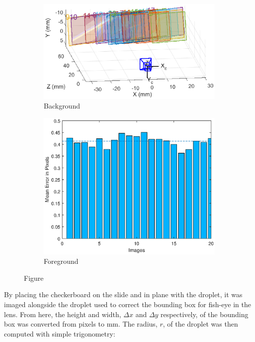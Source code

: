 \documentclass{physics_article_B}
\begin{document}
\begin{figure}[H]
    \centering
    \begin{subfigure}[b]{0.4\textwidth}
        \includegraphics[width=\textwidth]{Figures/CameraExtrinsics.eps}
        \caption{Background}
        \label{fig:calib:pos}
    \end{subfigure}
    \begin{subfigure}[b]{0.4\textwidth}
        \includegraphics[width=\textwidth]{Figures/CameraError.eps}
        \caption{Foreground}
        \label{fig:calib:error}
    \end{subfigure}
    \caption{Figure }\label{fig:calib}
\end{figure}

By placing the checkerboard on the slide and in plane with the droplet, it was imaged alongside the droplet used to correct the bounding box for fish-eye in the lens. From here, the height and width, $\Delta x$ and $\Delta y$ respectively, of the bounding box was converted from pixels to  mm. The radius, $r$, of the droplet was then computed with simple trigonometry:
\end{document}
